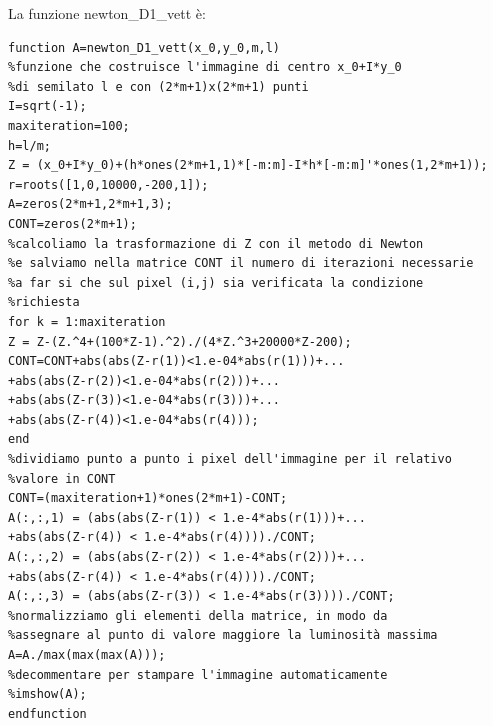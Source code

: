 \documentclass[11pt,a4paper,twoside,openright,titlepage,
headinclude,footinclude,BCOR5mm,
numbers=noenddot,cleardoublepage=empty,
tablecaptionabove]{scrbook}
\begin{document}
La funzione newton\_D1\_vett è:
\begin{lstlisting}[frame=trBL]
function A=newton_D1_vett(x_0,y_0,m,l)
%funzione che costruisce l'immagine di centro x_0+I*y_0
%di semilato l e con (2*m+1)x(2*m+1) punti
I=sqrt(-1);
maxiteration=100;
h=l/m;
Z = (x_0+I*y_0)+(h*ones(2*m+1,1)*[-m:m]-I*h*[-m:m]'*ones(1,2*m+1));
r=roots([1,0,10000,-200,1]);
A=zeros(2*m+1,2*m+1,3);
CONT=zeros(2*m+1);
%calcoliamo la trasformazione di Z con il metodo di Newton
%e salviamo nella matrice CONT il numero di iterazioni necessarie
%a far si che sul pixel (i,j) sia verificata la condizione 
%richiesta
for k = 1:maxiteration
Z = Z-(Z.^4+(100*Z-1).^2)./(4*Z.^3+20000*Z-200);
CONT=CONT+abs(abs(Z-r(1))<1.e-04*abs(r(1)))+...
+abs(abs(Z-r(2))<1.e-04*abs(r(2)))+...
+abs(abs(Z-r(3))<1.e-04*abs(r(3)))+...
+abs(abs(Z-r(4))<1.e-04*abs(r(4)));
end
%dividiamo punto a punto i pixel dell'immagine per il relativo 
%valore in CONT
CONT=(maxiteration+1)*ones(2*m+1)-CONT;
A(:,:,1) = (abs(abs(Z-r(1)) < 1.e-4*abs(r(1)))+...
+abs(abs(Z-r(4)) < 1.e-4*abs(r(4))))./CONT;
A(:,:,2) = (abs(abs(Z-r(2)) < 1.e-4*abs(r(2)))+...
+abs(abs(Z-r(4)) < 1.e-4*abs(r(4))))./CONT;
A(:,:,3) = (abs(abs(Z-r(3)) < 1.e-4*abs(r(3))))./CONT;
%normalizziamo gli elementi della matrice, in modo da
%assegnare al punto di valore maggiore la luminosità massima
A=A./max(max(max(A)));
%decommentare per stampare l'immagine automaticamente
%imshow(A);
endfunction
\end{lstlisting}
\end{document}
